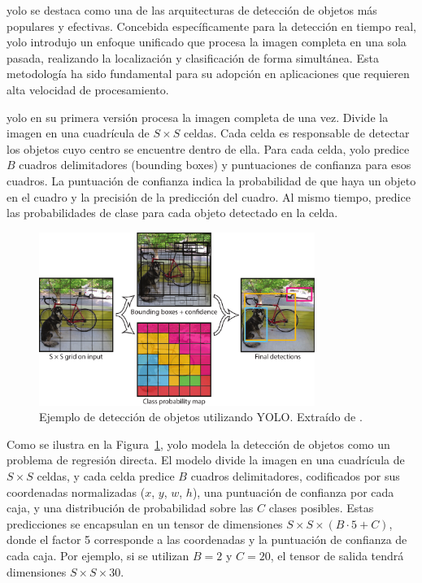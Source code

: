 \documentclass[11pt,spanish,listoffigures,listoftables]{tfgetsinf}
\begin{document}
\gls{yolo} se destaca como una de las arquitecturas de detección de objetos más populares y efectivas. Concebida específicamente para la detección en tiempo real, \gls{yolo} introdujo un enfoque unificado que procesa la imagen completa en una sola pasada, realizando la localización y clasificación de forma simultánea. Esta metodología ha sido fundamental para su adopción en aplicaciones que requieren alta velocidad de procesamiento.

\gls{yolo} en su primera versión procesa la imagen completa de una vez. Divide la imagen en una cuadrícula de $S \times S$ celdas. Cada celda es responsable de detectar los objetos cuyo centro se encuentre dentro de ella. Para cada celda, \gls{yolo} predice $B$ cuadros delimitadores (bounding boxes) y puntuaciones de confianza para esos cuadros. La puntuación de confianza indica la probabilidad de que haya un objeto en el cuadro y la precisión de la predicción del cuadro. Al mismo tiempo, predice las probabilidades de clase para cada objeto detectado en la celda.

\begin{figure}[H]
   \centering
   \includegraphics[width=0.8\textwidth]{images/estado_del_arte/yolo_detections_example.png}
   \caption[Ejemplo de detección de objetos utilizando YOLO]{Ejemplo de detección de objetos utilizando YOLO. Extraído de \cite[fig. 2, p. ~2]{redmon2016lookonceunifiedrealtime}.}
   \label{fig:yolo_detections_example}
\end{figure}

Como se ilustra en la Figura~\ref{fig:yolo_detections_example}, \gls{yolo} modela la detección de objetos como un problema de regresión directa. El modelo divide la imagen en una cuadrícula de $S \times S$ celdas, y cada celda predice $B$ cuadros delimitadores, codificados por sus coordenadas normalizadas ($x$, $y$, $w$, $h$), una puntuación de confianza por cada caja, y una distribución de probabilidad sobre las $C$ clases posibles. Estas predicciones se encapsulan en un tensor de dimensiones $S \times S \times (B \cdot 5 + C)$, donde el factor 5 corresponde a las coordenadas y la puntuación de confianza de cada caja. Por ejemplo, si se utilizan $B=2$ y $C=20$, el tensor de salida tendrá dimensiones $S \times S \times 30$.
\end{document}
